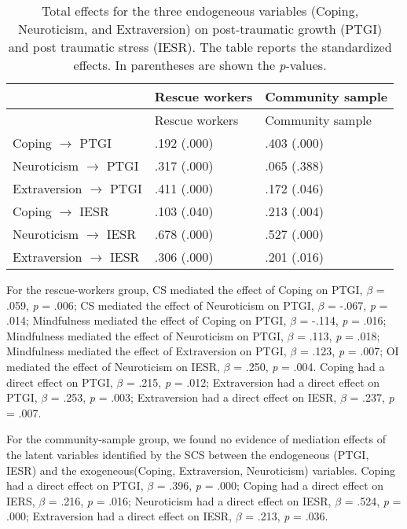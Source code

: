 \documentclass[
  man]{apa7}
\begin{document}
\begin{longtable}[]{@{}lll@{}}
\caption{Total effects for the three endogeneous variables (Coping, Neuroticism, and Extraversion) on post-traumatic growth (PTGI) and post traumatic stress (IESR). The table reports the standardized effects. In parentheses are shown the \emph{p}-values.}\tabularnewline
\toprule()
& Rescue workers & Community sample \\
\midrule()
\endfirsthead
\toprule()
& Rescue workers & Community sample \\
\midrule()
\endhead
Coping \(\rightarrow\) PTGI & .192 (.000) & .403 (.000) \\
Neuroticism \(\rightarrow\) PTGI & .317 (.000) & .065 (.388) \\
Extraversion \(\rightarrow\) PTGI & .411 (.000) & .172 (.046) \\
Coping \(\rightarrow\) IESR & .103 (.040) & .213 (.004) \\
Neuroticism \(\rightarrow\) IESR & .678 (.000) & .527 (.000) \\
Extraversion \(\rightarrow\) IESR & .306 (.000) & .201 (.016) \\
\bottomrule()
\end{longtable}

For the rescue-workers group,
CS mediated the effect of Coping on PTGI, \(\beta\) = .059, \emph{p} = .006;
CS mediated the effect of Neuroticism on PTGI, \(\beta\) = -.067, \emph{p} = .014;
Mindfulness mediated the effect of Coping on PTGI, \(\beta\) = -.114, \emph{p} = .016;
Mindfulness mediated the effect of Neuroticism on PTGI, \(\beta\) = .113, \emph{p} = .018;
Mindfulness mediated the effect of Extraversion on PTGI, \(\beta\) = .123, \emph{p} = .007;
OI mediated the effect of Neuroticism on IESR, \(\beta\) = .250, \emph{p} = .004.
Coping had a direct effect on PTGI, \(\beta\) = .215, \emph{p} = .012; Extraversion had a direct effect on PTGI, \(\beta\) = .253, \emph{p} = .003; Extraversion had a direct effect on IESR, \(\beta\) = .237, \emph{p} = .007.

For the community-sample group, we found no evidence of mediation effects of the latent variables identified by the SCS between the endogeneous (PTGI, IESR) and the exogeneous(Coping, Extraversion, Neuroticism) variables.
Coping had a direct effect on PTGI, \(\beta\) = .396, \emph{p} = .000;
Coping had a direct effect on IERS, \(\beta\) = .216, \emph{p} = .016;
Neuroticism had a direct effect on IESR, \(\beta\) = .524, \emph{p} = .000;
Extraversion had a direct effect on IESR, \(\beta\) = .213, \emph{p} = .036.
\end{document}
